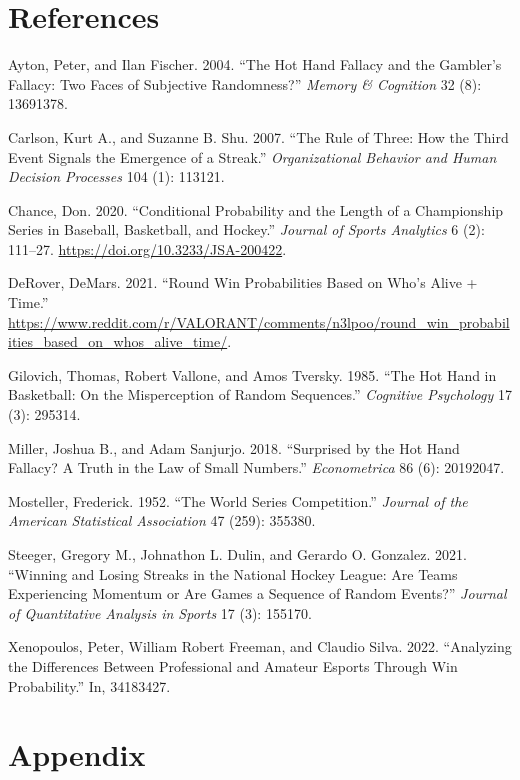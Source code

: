 \documentclass{article}
\newlength{\cslhangindent}
\newlength{\cslentryspacingunit} %
\newenvironment{CSLReferences}[2] %
 {%
  \setlength{\parindent}{0pt}
  \ifodd #1
  \let\oldpar\par
  \def\par{\hangindent=\cslhangindent\oldpar}
  \fi
  \setlength{\parskip}{#2\cslentryspacingunit}
 }%
 {}
\begin{document}
\hypertarget{references}{%
\section*{References}\label{references}}

\hypertarget{refs}{}
\begin{CSLReferences}{1}{0}
\leavevmode{}%
Ayton, Peter, and Ilan Fischer. 2004. {``The Hot Hand Fallacy and the
Gambler{'}s Fallacy: Two Faces of Subjective Randomness?''} \emph{Memory
\& Cognition} 32 (8): 13691378.

\leavevmode{}%
Carlson, Kurt A., and Suzanne B. Shu. 2007. {``The Rule of Three: How
the Third Event Signals the Emergence of a Streak.''}
\emph{Organizational Behavior and Human Decision Processes} 104 (1):
113121.

\leavevmode{}%
Chance, Don. 2020. {``Conditional Probability and the Length of a
Championship Series in Baseball, Basketball, and Hockey.''}
\emph{Journal of Sports Analytics} 6 (2): 111--27.
\url{https://doi.org/10.3233/JSA-200422}.

\leavevmode{}%
DeRover, DeMars. 2021. {``Round Win Probabilities Based on Who's Alive +
Time.''}
\url{https://www.reddit.com/r/VALORANT/comments/n3lpoo/round_win_probabilities_based_on_whos_alive_time/}.

\leavevmode{}%
Gilovich, Thomas, Robert Vallone, and Amos Tversky. 1985. {``The Hot
Hand in Basketball: On the Misperception of Random Sequences.''}
\emph{Cognitive Psychology} 17 (3): 295314.

\leavevmode{}%
Miller, Joshua B., and Adam Sanjurjo. 2018. {``Surprised by the Hot Hand
Fallacy? A Truth in the Law of Small Numbers.''} \emph{Econometrica} 86
(6): 20192047.

\leavevmode{}%
Mosteller, Frederick. 1952. {``The World Series Competition.''}
\emph{Journal of the American Statistical Association} 47 (259): 355380.

\leavevmode{}%
Steeger, Gregory M., Johnathon L. Dulin, and Gerardo O. Gonzalez. 2021.
{``Winning and Losing Streaks in the National Hockey League: Are Teams
Experiencing Momentum or Are Games a Sequence of Random Events?''}
\emph{Journal of Quantitative Analysis in Sports} 17 (3): 155170.

\leavevmode{}%
Xenopoulos, Peter, William Robert Freeman, and Claudio Silva. 2022.
{``Analyzing the Differences Between Professional and Amateur Esports
Through Win Probability.''} In, 34183427.

\end{CSLReferences}

\hypertarget{appendix}{%
\section*{Appendix}\label{appendix}}



\end{document}
